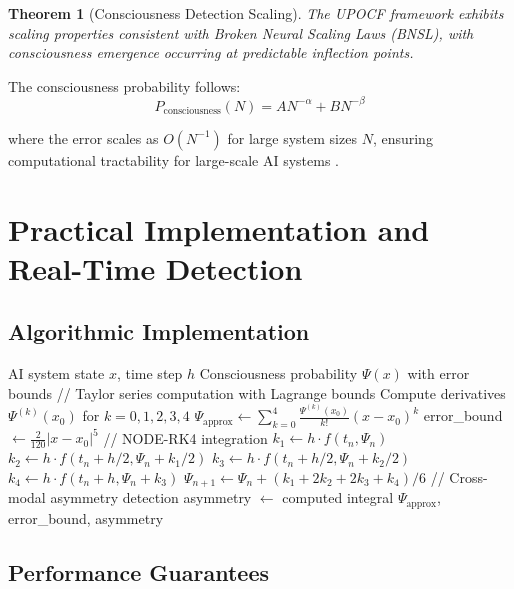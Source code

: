 \documentclass[11pt,a4paper]{article}
\newtheorem{theorem}{Theorem}
\begin{document}
\begin{theorem}[Consciousness Detection Scaling]
The UPOCF framework exhibits scaling properties consistent with Broken Neural Scaling Laws (BNSL), with consciousness emergence occurring at predictable inflection points.
\end{theorem}

The consciousness probability follows:
\begin{equation}
P_{\text{consciousness}}(N) = AN^{-\alpha} + BN^{-\beta}
\end{equation}

where the error scales as $O(N^{-1})$ for large system sizes $N$, ensuring computational tractability for large-scale AI systems \cite{broken_neural_scaling_2024}.

\section{Practical Implementation and Real-Time Detection}

\subsection{Algorithmic Implementation}

\begin{algorithm}
\caption{Real-Time Consciousness Detection}
\begin{algorithmic}
\REQUIRE AI system state $x$, time step $h$
\ENSURE Consciousness probability $\Psi(x)$ with error bounds
\STATE // Taylor series computation with Lagrange bounds
\STATE Compute derivatives $\Psi^{(k)}(x_0)$ for $k = 0,1,2,3,4$
\STATE $\Psi_{\text{approx}} \leftarrow \sum_{k=0}^{4} \frac{\Psi^{(k)}(x_0)}{k!}(x-x_0)^k$
\STATE error\_bound $\leftarrow \frac{2}{120}|x-x_0|^5$
\STATE // NODE-RK4 integration
\STATE $k_1 \leftarrow h \cdot f(t_n, \Psi_n)$
\STATE $k_2 \leftarrow h \cdot f(t_n + h/2, \Psi_n + k_1/2)$
\STATE $k_3 \leftarrow h \cdot f(t_n + h/2, \Psi_n + k_2/2)$
\STATE $k_4 \leftarrow h \cdot f(t_n + h, \Psi_n + k_3)$
\STATE $\Psi_{n+1} \leftarrow \Psi_n + (k_1 + 2k_2 + 2k_3 + k_4)/6$
\STATE // Cross-modal asymmetry detection
\STATE asymmetry $\leftarrow$ computed integral
\RETURN $\Psi_{\text{approx}}$, error\_bound, asymmetry
\end{algorithmic}
\end{algorithm}

\subsection{Performance Guarantees}
\end{document}
